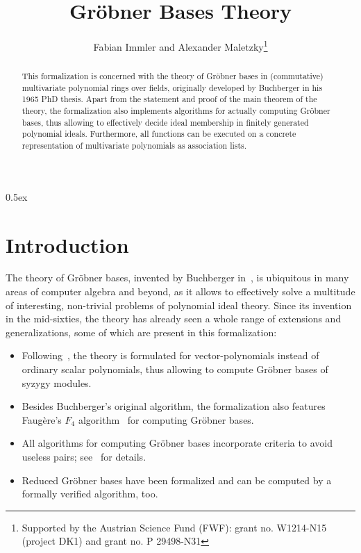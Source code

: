\documentclass[11pt,a4paper]{article}
\begin{document}
\title{Gr\"obner Bases Theory}
\author{Fabian Immler and Alexander Maletzky\thanks{Supported by the Austrian 
Science Fund (FWF): grant no. W1214-N15 (project DK1) and grant no. P 29498-N31}}
\maketitle

\begin{abstract}
This formalization is concerned with the theory of Gr\"obner bases in 
(commutative) multivariate polynomial rings over fields, originally developed 
by Buchberger in his 1965 PhD thesis. Apart from the statement and proof of the 
main theorem of the theory, the formalization also implements algorithms for actually computing 
Gr\"obner bases, thus allowing to effectively decide ideal membership in finitely generated 
polynomial ideals. Furthermore, all functions can be executed on a concrete 
representation of multivariate polynomials as association lists.
\end{abstract}

\tableofcontents

\parindent 0pt\parskip 0.5ex

\newpage
\section{Introduction}

The theory of Gr\"obner bases, invented by Buchberger in~\cite{Buchberger1965,Buchberger1970}, is 
ubiquitous in many areas of 
computer algebra and beyond, as it allows to effectively solve a multitude of 
interesting, non-trivial problems of polynomial ideal theory. Since its 
invention in the mid-sixties, the theory has already seen a whole range of 
extensions and generalizations, some of which are present in this formalization:
\begin{itemize}
 \item Following~\cite{Kreuzer2000}, the theory is formulated for vector-polynomials instead of 
ordinary scalar polynomials, thus allowing to compute Gr\"obner bases of syzygy modules.
 
 \item Besides Buchberger's original algorithm, the formalization also features Faug\`ere's $F_4$ 
algorithm~\cite{Faugere1999} for computing Gr\"obner bases.

 \item All algorithms for computing Gr\"obner bases incorporate criteria to avoid useless pairs; 
see~\cite{Buchberger1979} for details.

 \item Reduced Gr\"obner bases have been formalized and can be computed by a formally verified 
algorithm, too.
\end{itemize}
\end{document}
